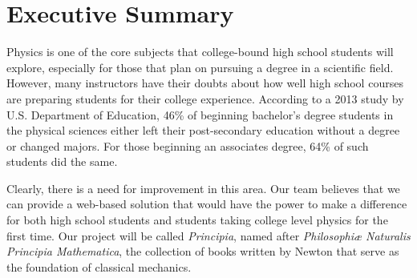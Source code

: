 \section{Executive Summary}
\iffalse
The purpose of this introduction to your idea is to clearly and succinctly describe the final goal of the project. It should list key features and components and explain why the project is interesting and worthwhile.

When "searching for funding/approval" you have very little time/space to capture the interest of the reader. You need to concisely describe what the project will do, what need it will address, and why a completed project with be of benefit. You also need to convey interest, enthusiasm, and determination. You want the reader coming away from this first page eager to know more and excited about the prospects.
 
This section should be one page long.

NOTES:
Look at: 
"A meta-analysis of the effectiveness of computer-assisted instruction in science education"

"Success in introductory college physics: the role of high school preparation"

"STEM Attrition: College Students' Paths Into and Out of STEM Fields"

"Trends in International Mathematics and Science Study"

\fi

Physics is one of the core subjects that college-bound high school students will explore, especially for those that plan on pursuing a degree in a scientific field. However, many instructors have their doubts about how well high school courses are preparing students for their college experience. According to a 2013 study by U.S. Department of Education, 46\% of beginning bachelor's degree students in the physical sciences either left their post-secondary education without a degree or changed majors. For those beginning an associates degree, 64\% of such students did the same. %

Clearly, there is a need for improvement in this area. Our team believes that we can provide a web-based solution that would have the power to make a difference for both high school students and students taking college level physics for the first time. Our project will be called \textit{Principia}, named after \textit{Philosophiæ Naturalis Principia Mathematica}, the collection of books written by Newton that serve as the foundation of classical mechanics. 

